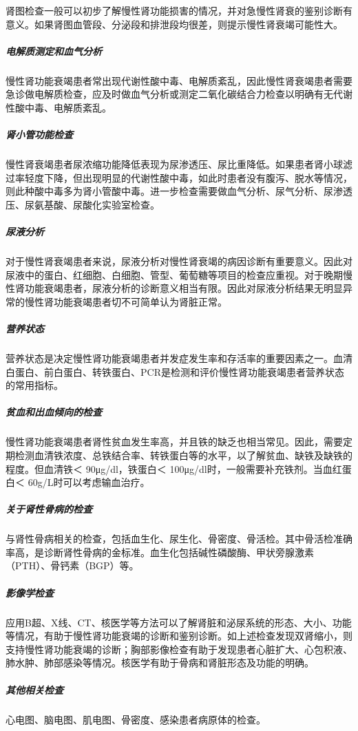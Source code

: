 肾图检查一般可以初步了解慢性肾功能损害的情况，并对急慢性肾衰的鉴别诊断有意义。如果肾图血管段、分泌段和排泄段均很差，则提示慢性肾衰竭可能性大。

\subparagraph{电解质测定和血气分析}

慢性肾功能衰竭患者常出现代谢性酸中毒、电解质紊乱，因此慢性肾衰竭患者需要急诊做电解质检查，应及时做血气分析或测定二氧化碳结合力检查以明确有无代谢性酸中毒、电解质紊乱。

\subparagraph{肾小管功能检查}

慢性肾衰竭患者尿浓缩功能降低表现为尿渗透压、尿比重降低。如果患者肾小球滤过率轻度下降，但出现明显的代谢性酸中毒，如此时患者没有腹泻、脱水等情况，则此种酸中毒多为肾小管酸中毒。进一步检查需要做血气分析、尿气分析、尿渗透压、尿氨基酸、尿酸化实验室检查。

\subparagraph{尿液分析}

对于慢性肾衰竭患者来说，尿液分析对慢性肾衰竭的病因诊断有重要意义。因此对尿液中的蛋白、红细胞、白细胞、管型、葡萄糖等项目的检查应重视。对于晚期慢性肾功能衰竭患者，尿液分析的诊断意义相当有限。因此对尿液分析结果无明显异常的慢性肾功能衰竭患者切不可简单认为肾脏正常。

\subparagraph{营养状态}

营养状态是决定慢性肾功能衰竭患者并发症发生率和存活率的重要因素之一。血清白蛋白、前白蛋白、转铁蛋白、PCR是检测和评价慢性肾功能衰竭患者营养状态的常用指标。

\subparagraph{贫血和出血倾向的检查}

慢性肾功能衰竭患者肾性贫血发生率高，并且铁的缺乏也相当常见。因此，需要定期检测血清铁浓度、总铁结合率、转铁蛋白等的水平，以了解贫血、缺铁及缺铁的程度。但血清铁＜
90μg/dl，铁蛋白＜ 100μg/dl时，一般需要补充铁剂。当血红蛋白＜
60g/L时可以考虑输血治疗。

\subparagraph{关于肾性骨病的检查}

与肾性骨病相关的检查，包括血生化、尿生化、骨密度、骨活检。其中骨活检准确率高，是诊断肾性骨病的金标准。血生化包括碱性磷酸酶、甲状旁腺激素（PTH）、骨钙素（BGP）等。

\subparagraph{影像学检查}

应用B超、X线、CT、核医学等方法可以了解肾脏和泌尿系统的形态、大小、功能等情况，有助于慢性肾功能衰竭的诊断和鉴别诊断。如上述检查发现双肾缩小，则支持慢性肾功能衰竭的诊断；胸部影像检查有助于发现患者心脏扩大、心包积液、肺水肿、肺部感染等情况。核医学有助于骨病和肾脏形态及功能的明确。

\subparagraph{其他相关检查}

心电图、脑电图、肌电图、骨密度、感染患者病原体的检查。

